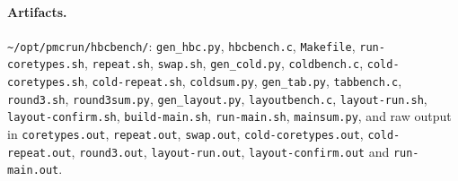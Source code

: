 \documentclass[10pt]{article}
\begin{document}
{\raggedright\paragraph{Artifacts.} \texttt{\textasciitilde/opt/pmcrun/hbcbench/}: \texttt{gen\_hbc.py},
\texttt{hbcbench.c}, \texttt{Makefile}, \texttt{run-coretypes.sh}, \texttt{repeat.sh},
\texttt{swap.sh}, \texttt{gen\_cold.py}, \texttt{coldbench.c}, \texttt{cold-coretypes.sh},
\texttt{cold-repeat.sh}, \texttt{coldsum.py}, \texttt{gen\_tab.py}, \texttt{tabbench.c},
\texttt{round3.sh}, \texttt{round3sum.py}, \texttt{gen\_layout.py}, \texttt{layoutbench.c},
\texttt{layout-run.sh}, \texttt{layout-confirm.sh}, \texttt{build-main.sh}, \texttt{run-main.sh},
\texttt{mainsum.py}, and raw output in \texttt{coretypes.out},
\texttt{repeat.out}, \texttt{swap.out}, \texttt{cold-coretypes.out}, \texttt{cold-repeat.out},
\texttt{round3.out}, \texttt{layout-run.out}, \texttt{layout-confirm.out} and \texttt{run-main.out}.\par}
\end{document}
